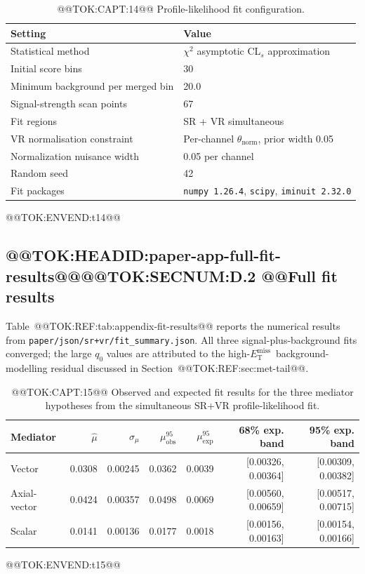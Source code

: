 \documentclass[11pt]{article}
\newcommand{\MET}{\ensuremath{E_{\mathrm{T}}^{\mathrm{miss}}}}
\begin{document}
\begin{table}[h]
\centering
\caption{@@TOK:CAPT:14@@ Profile-likelihood fit configuration.}
\label{tab:appendix-fit-config}
%
\begin{tabular}{ll}
\toprule
Setting & Value \\
\midrule
Statistical method & \(\chi^2\) asymptotic CL\(_s\) approximation \\
Initial score bins & 30 \\
Minimum background per merged bin & 20.0 \\
Signal-strength scan points & 67 \\
Fit regions & SR + VR simultaneous \\
VR normalisation constraint & Per-channel $\theta_{\mathrm{norm}}$, prior width 0.05 \\
Normalization nuisance width & 0.05 per channel \\
Random seed & 42 \\
Fit packages & \texttt{numpy 1.26.4}, \texttt{scipy}, \texttt{iminuit 2.32.0} \\
\bottomrule
\end{tabular}

@@TOK:ENVEND:t14@@\end{table}

\subsection{@@TOK:HEADID:paper-app-full-fit-results@@@@TOK:SECNUM:D.2 @@Full fit results}

Table~@@TOK:REF:tab:appendix-fit-results@@ reports the numerical results from
\texttt{paper/json/sr+vr/fit\_summary.json}. All three signal-plus-background
fits converged; the large \(q_0\) values are attributed to the
high-\MET\ background-modelling residual discussed in
Section~@@TOK:REF:sec:met-tail@@.

\begin{table}[h]
\centering
\caption{@@TOK:CAPT:15@@ Observed and expected fit results for the three mediator hypotheses from the simultaneous SR+VR profile-likelihood fit.}
\label{tab:appendix-fit-results}
%
\begin{tabular}{lrrrrrr}
\toprule
Mediator & \(\hat{\mu}\) & \(\sigma_{\mu}\) & \(\mu^{95}_{\mathrm{obs}}\) & \(\mu^{95}_{\mathrm{exp}}\) & 68\% exp. band & 95\% exp. band \\
\midrule
Vector      & 0.0308 & 0.00245 & 0.0362 & 0.0039 &
  [0.00326, 0.00364] & [0.00309, 0.00382] \\
Axial-vector & 0.0424 & 0.00357 & 0.0498 & 0.0069 &
  [0.00560, 0.00659] & [0.00517, 0.00715] \\
Scalar      & 0.0141 & 0.00136 & 0.0177 & 0.0018 &
  [0.00156, 0.00163] & [0.00154, 0.00166] \\
\bottomrule
\end{tabular}

@@TOK:ENVEND:t15@@\end{table}
\end{document}
